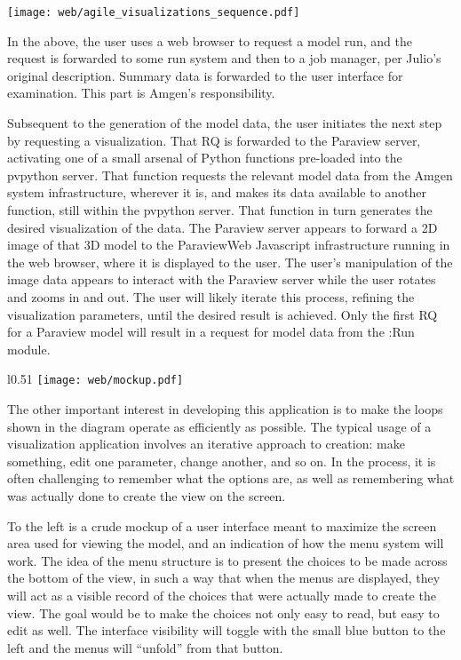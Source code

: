 \documentclass[11pt]{tsmemo}
\begin{document}
\begin{memo}
\vspace{-0.45in}\hspace{-.5in}
\texttt{[image: web/agile\_visualizations\_sequence.pdf]}

\vspace{-0.4in}

In the above, the user uses a web browser to request a model run,
and the request is forwarded to some run system and then to a job
manager, per Julio's original description.  Summary data is forwarded
to the user interface for examination.  This part is Amgen's
responsibility.

Subsequent to the generation of the model data, the user initiates the
next step by requesting a visualization.  That RQ is forwarded to the
Paraview server, activating one of a small arsenal of Python functions
pre-loaded into the pvpython server.  That function requests the
relevant model data from the Amgen system infrastructure, wherever it
is, and makes its data available to another function, still within the
pvpython server.  That function in turn generates the desired
visualization of the data.  The Paraview server appears to forward a
2D image of that 3D model
to the ParaviewWeb Javascript infrastructure running in the web
browser, where it is displayed to the user.  The user's manipulation
of the image data appears to interact with the Paraview server while
the user rotates and zooms in and out.  The user will likely iterate
this process, refining
the visualization parameters, until the desired result is achieved.
Only the first RQ for a Paraview model will result in a request for
model data from the :Run module.




\begin{wrapfigure}{l}{0.51\columnwidth}
\texttt{[image: web/mockup.pdf]}
\end{wrapfigure}

The other important interest in developing this application is to make
the loops shown in the diagram operate as efficiently as possible.
The typical usage of a visualization application involves an iterative
approach to creation: make something, edit one
parameter, change another, and so on.  In the process, it is often
challenging to remember what the options are, as well as remembering
what was actually done to create the view on the screen.

To the left is a crude mockup of a user interface meant to maximize
the screen area used for viewing the model, and an indication of how
the menu system will work.  The idea of the menu structure is to present the
choices to be made across the bottom of the view, in such a way that
when the menus are displayed, they will act as a visible record of the choices
that were actually made to create the view.  The goal would be to make
the choices not only easy to read, but easy to edit as well. The interface visibility will toggle with
the small blue button to the left and the menus will ``unfold'' from
that button.


\end{memo}
\end{document}
